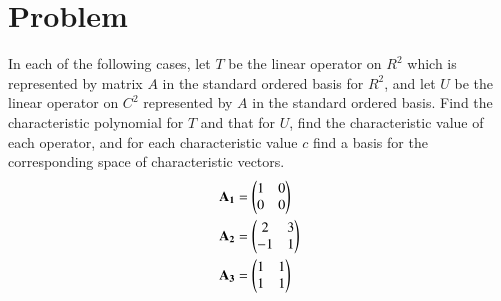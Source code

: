 \documentclass[journal,12pt,twocolumn]{IEEEtran}
\begin{document}
\section{\textbf{Problem}}
In each of the following cases, let $T$ be the linear operator on $R^2$ which is represented by matrix $A$ in the standard ordered basis for $R^2$, and let $U$ be the linear operator on $C^2$ represented by $A$ in the standard ordered basis. Find the characteristic polynomial for $T$ and that for $U$, find the characteristic value of each operator, and for each characteristic value $c$ find a basis for the corresponding space of characteristic vectors.
\begin{align}
    \mathbf{A_1} &= \begin{pmatrix}1&0\\
                     0&0\end{pmatrix}\\
    \mathbf{A_2} &= \begin{pmatrix}2&3\\
                     -1&1\end{pmatrix}\\
    \mathbf{A_3} &= \begin{pmatrix}1&1\\
                     1&1\end{pmatrix}
\end{align}     
\end{document}
